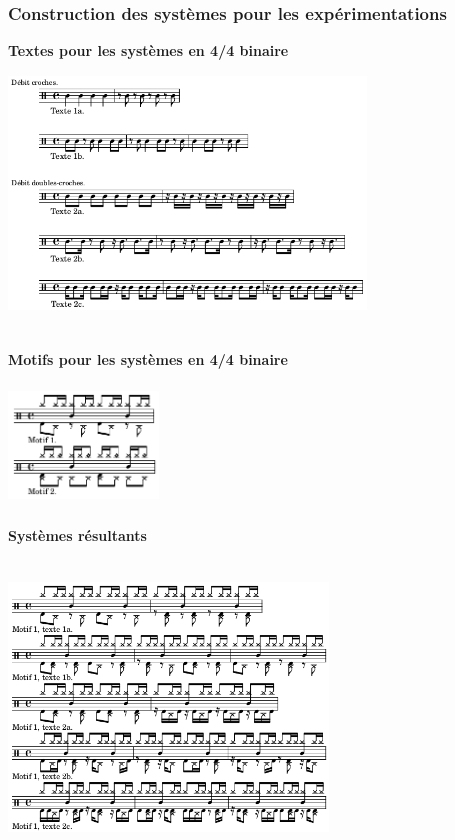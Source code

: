 \subsubsection{Construction des systèmes pour les expérimentations}
\textbf{Textes pour les systèmes en 4/4 binaire}\\
\includegraphics[height=70mm, width=95mm]{z_images/1_description_notation/systemes/0_textes_4-4_binaires.png}\\\\
\textbf{Motifs pour les systèmes en 4/4 binaire}\\\\
\includegraphics[height=30mm, width=40mm]{z_images/1_description_notation/systemes/1_motifs_4-4_binaires.png}\\\\
\textbf{Systèmes résultants}\\\\
\includegraphics[height=75mm, width=85mm]{z_images/3_experimentations/experience_1/systeme_recherche_1.png}
